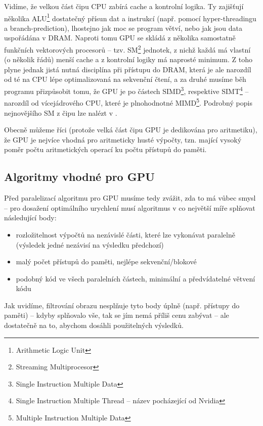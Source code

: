         Vidíme, že velkou část čipu CPU zabírá cache a kontrolní logika. Ty zajišťují několika ALU\footnote{Arithmetic Logic Unit} dostatečný přísun dat a instrukcí (např. pomocí hyper-threadingu a branch-prediction), lhostejno jak moc se program větví, nebo jak jsou data uspořádána v DRAM. Naproti tomu GPU se skládá z několika samostatně funkčních vektorových procesorů -- tzv. SM\footnote{Streaming Multiprocesor} jednotek, z nichž každá má vlastní (o několik řádů) menší cache a z kontrolní logiky má naprosté minimum. Z toho plyne jednak jistá nutná disciplína při přístupu do DRAM, která je ale narozdíl od té na CPU lépe optimalizovaná na sekvenční čtení, a za druhé musíme běh programu přizpůsobit tomu, že GPU je po částech SIMD\footnote{Single Instruction Multiple Data}, respektive SIMT\footnote{Single Instruction Multiple Thread -- název pocházející od Nvidia} -- narozdíl od vícejádrového CPU, které je plnohodnotné MIMD\footnote{Multiple Instruction Multiple Data}. Podrobný popis nejnovějšího SM z čipu \FERMI lze nalézt v \cite{Fermi}.
        
        Obecně můžeme říci (protože velká část čipu GPU je dedikována pro aritmetiku), že GPU je nejvíce vhodná pro aritmeticky husté výpočty, tzn. mající vysoký poměr počtu aritmetických operací ku počtu přístupů do paměti. 
        
    \subsection{Algoritmy vhodné pro GPU}
    
        Před paralelizací algoritmu pro GPU musíme tedy zvážit, zda to má vůbec smysl -- pro dosažení optimálního urychlení musí algoritmus v co největší míře splňovat následující body:
        \begin{itemize}
          \item rozložitelnost výpočtů na nezávislé části, které lze vykonávat paralelně (výsledek jedné nezávisí na výsledku předchozí)
          \item malý počet přístupů do paměti, nejlépe sekvenční/blokové
          \item podobný kód ve všech paralelních částech, minimální a předvídatelné větvení kódu
        \end{itemize}
        
        Jak uvidíme, filtrování obrazu nesplňuje tyto body úplně (např. přístupy do paměti) -- kdyby splňovalo vše, tak se jím nemá příliš cenu zabývat -- ale dostatečně na to, abychom dosáhli použitelných výsledků.
    
